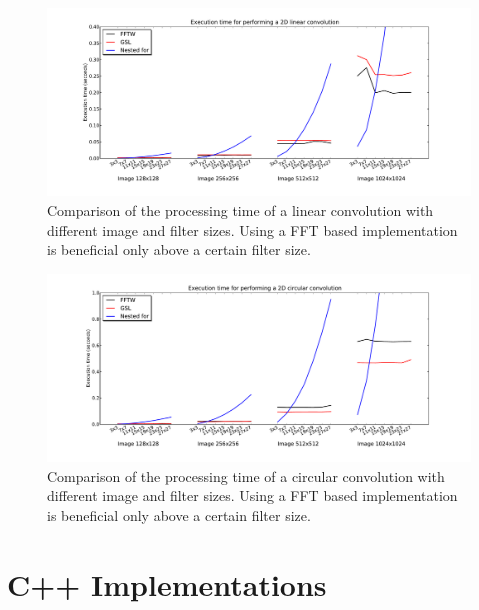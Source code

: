 \documentclass[a4paper,10pt,twoside]{article}
\begin{document}
\begin{figure}[htbp]
\center \includegraphics[width=.75\linewidth]{../Images/benchmark_linear_everything.pdf}
\caption{\label{fig:benchmark_linear_everything.pdf} Comparison of the processing time of a linear convolution with different image and filter sizes. Using a FFT based implementation is beneficial only above a certain filter size.}
\end{figure}

\begin{figure}[htbp]
\center \includegraphics[width=.75\linewidth]{../Images/benchmark_circular_everything.pdf}
\caption{\label{fig:benchmark_circular_everything.pdf} Comparison of the processing time of a circular convolution with different image and filter sizes. Using a FFT based implementation is beneficial only above a certain filter size.}
\end{figure}

\section{C++ Implementations}
\end{document}
